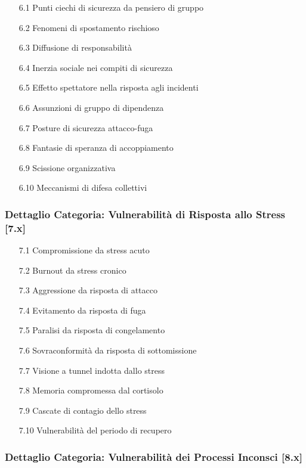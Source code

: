 \documentclass[11pt,a4paper]{article}
\begin{document}
\begin{enumerate}
\item[6.1] Punti ciechi di sicurezza da pensiero di gruppo
\item[6.2] Fenomeni di spostamento rischioso
\item[6.3] Diffusione di responsabilità
\item[6.4] Inerzia sociale nei compiti di sicurezza
\item[6.5] Effetto spettatore nella risposta agli incidenti
\item[6.6] Assunzioni di gruppo di dipendenza
\item[6.7] Posture di sicurezza attacco-fuga
\item[6.8] Fantasie di speranza di accoppiamento
\item[6.9] Scissione organizzativa
\item[6.10] Meccanismi di difesa collettivi
\end{enumerate}

\subsubsection{Dettaglio Categoria: Vulnerabilità di Risposta allo Stress [7.x]}

\begin{enumerate}
\item[7.1] Compromissione da stress acuto
\item[7.2] Burnout da stress cronico
\item[7.3] Aggressione da risposta di attacco
\item[7.4] Evitamento da risposta di fuga
\item[7.5] Paralisi da risposta di congelamento
\item[7.6] Sovraconformità da risposta di sottomissione
\item[7.7] Visione a tunnel indotta dallo stress
\item[7.8] Memoria compromessa dal cortisolo
\item[7.9] Cascate di contagio dello stress
\item[7.10] Vulnerabilità del periodo di recupero
\end{enumerate}

\subsubsection{Dettaglio Categoria: Vulnerabilità dei Processi Inconsci [8.x]}
\end{document}
